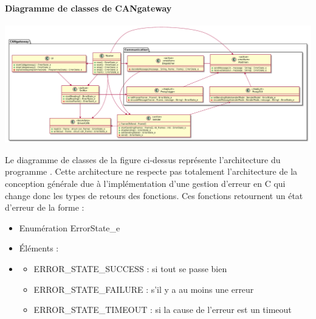 \paragraph{Diagramme de classes de CANgateway}

\begin{minipage}
    {\linewidth}
    \centering
    \includegraphics[width=\linewidth]{../schemas/Conception_detaillee/diag_classe_CANgateway.pdf}
\end{minipage}

\medspace

Le diagramme de classes de la figure ci-dessus représente l'architecture du programme {\nomLogiciel}. Cette architecture ne respecte pas totalement l'architecture de la conception générale due à l'implémentation d'une gestion d'erreur en C qui change donc les types de retours des fonctions. 
Ces fonctions retournent un état d'erreur de la forme : 
\begin{itemize}
    \item Enumération ErrorState\_e
    \item \'Eléments : 
    \item \begin{itemize}
        \item ERROR\_STATE\_SUCCESS : si tout se passe bien 
        \item ERROR\_STATE\_FAILURE : s'il y a au moins une erreur
        \item ERROR\_STATE\_TIMEOUT : si la cause de l'erreur est un timeout
    \end{itemize}
\end{itemize} 